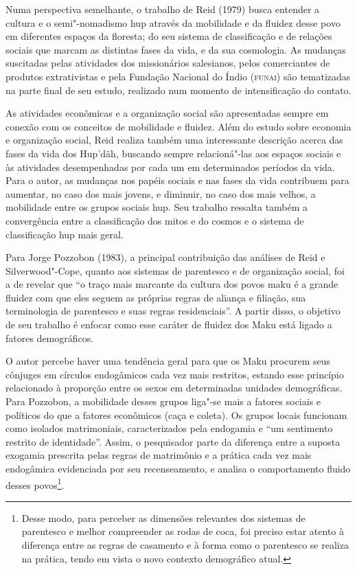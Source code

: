 Numa perspectiva semelhante, o trabalho de Reid (1979) busca entender a
cultura e o semi"-nomadismo hup através da mobilidade e da fluidez desse
povo em diferentes espaços da floresta; do seu sistema de classificação
e de relações sociais que marcam as distintas fases da vida, e da sua
cosmologia. As mudanças suscitadas pelas atividades dos missionários
salesianos, pelos comerciantes de produtos extrativistas e pela Fundação
Nacional do Índio (\textsc{funai}) são tematizadas na parte final de seu estudo,
realizado num momento de intensificação do contato.

As atividades econômicas e a organização social são apresentadas sempre
em conexão com os conceitos de mobilidade e fluidez. Além do estudo
sobre economia e organização social, Reid realiza também uma
interessante descrição acerca das fases da vida dos Hup'däh, buscando
sempre relacioná"-las aos espaços sociais e às atividades desempenhadas
por cada um em determinados períodos da vida. Para o autor, as mudanças
nos papéis sociais e nas fases da vida contribuem para aumentar, no caso
dos mais jovens, e diminuir, no caso dos mais velhos, a mobilidade entre
os grupos sociais hup. Seu trabalho ressalta também a convergência entre
a classificação dos mitos e do cosmos e o sistema de classificação hup
mais geral.

Para Jorge Pozzobon (1983), a principal contribuição das análises de
Reid e Silverwood"-Cope, quanto aos sistemas de parentesco e de
organização social, foi a de revelar que ``o traço mais marcante da
cultura dos povos maku é a grande fluidez com que eles seguem as
próprias regras de aliança e filiação, sua terminologia de parentesco e
suas regras residenciais''. A partir disso, o objetivo de seu trabalho é
enfocar como esse caráter de fluidez dos Maku está ligado a fatores
demográficos.

O autor percebe haver uma tendência geral para que os Maku procurem seus
cônjuges em círculos endogâmicos cada vez mais restritos, estando esse
princípio relacionado à proporção entre os sexos em determinadas
unidades demográficas. Para Pozzobon, a mobilidade desses grupos liga"-se
mais a fatores sociais e políticos do que a fatores econômicos (caça e
coleta). Os grupos locais funcionam como isolados matrimoniais,
caracterizados pela endogamia e ``um sentimento restrito de
identidade''. Assim, o pesquisador parte da diferença entre a suposta
exogamia prescrita pelas regras de matrimônio e a prática cada vez mais
endogâmica evidenciada por seu recenseamento, e analisa o comportamento
fluido desses povos\footnote{Desse modo, para perceber as dimensões
  relevantes dos sistemas de parentesco e melhor compreender as rodas de
  coca, foi preciso estar atento à diferença entre as regras de
  casamento e à forma como o parentesco se realiza na prática, tendo em
  vista o novo contexto demográfico atual.}.

